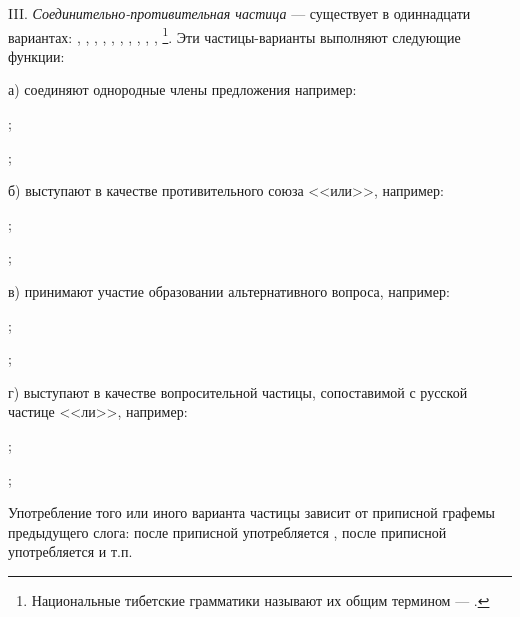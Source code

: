 III. \emph{Соединительно-противительная частица} --- существует в одиннадцати вариантах:
, , ,
, , ,
, , ,
, \footnote[49]{Национальные тибетские грамматики называют их общим термином --- .}.
Эти частицы-варианты выполняют следующие функции:

а) соединяют однородные члены предложения например:
\begin{prfsample}
	\item {};
	\item {};
\end{prfsample}

б) выступают в качестве противительного союза <<или>>, например:
\begin{prfsample}
	\item {};
	\item {};
\end{prfsample}

в) принимают участие образовании альтернативного вопроса, например:
\begin{prfsample}
	\item {};
	\item {};
\end{prfsample}

г) выступают в качестве вопросительной частицы, сопоставимой с русской частице <<ли>>, например:
\begin{prfsample}
	\item {};
	\item {};
\end{prfsample}

Употребление того или иного варианта частицы зависит от приписной графемы предыдущего слога: после приписной  употребляется , после приписной  употребляется  и т.п.

